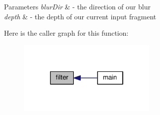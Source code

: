 \begin{DoxyParams}{Parameters}
{\em blur\-Dir} & -\/ the direction of our blur \\
\hline
{\em depth} & -\/ the depth of our current input fragment \\
\hline
\end{DoxyParams}


Here is the caller graph for this function\-:\nopagebreak
\begin{figure}[H]
\begin{center}
\leavevmode
\includegraphics[width=190pt]{bilateral_filter_frag_8glsl_a7fc9433dc7caa1f33078fafa0bf43dda_icgraph}
\end{center}
\end{figure}


